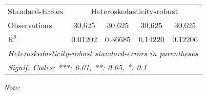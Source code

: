 \begin{table}[htbp!]
\begin{adjustbox}{width = 1\textwidth, max height = 0.95\textheight, center}
\begin{threeparttable}[b]
\begin{tabular}{lcccc}
            \midrule 
            Standard-Errors & \multicolumn{4}{c}{Heteroskedasticity-robust} \\ 
            Observations         & 30,625                         & 30,625                         & 30,625                          & 30,625\\  
            R$^2$                & 0.01202                        & 0.36685                        & 0.14220                         & 0.12206\\  
            \midrule \midrule
            \multicolumn{5}{l}{\emph{Heteroskedasticity-robust standard-errors in parentheses}}\\
            \multicolumn{5}{l}{\emph{Signif. Codes: ***: 0.01, **: 0.05, *: 0.1}}\\
         \end{tabular}
         
         \begin{tablenotes}\item \medskip \textit{Note:}
         \end{tablenotes}
      \end{threeparttable}
   \end{adjustbox}
\end{table}



